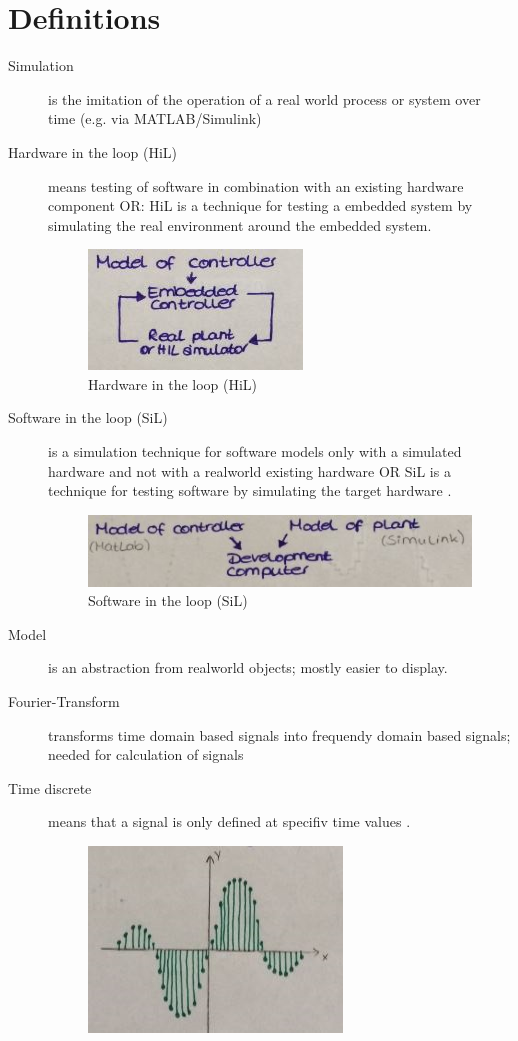 \section{Definitions}
\begin{description}
	\item[Simulation] is the imitation of the operation of a real world process or system over time (e.g. via MATLAB/Simulink)
	\item[Hardware in the loop (HiL)] means testing of software in combination with an existing hardware component OR: HiL is a technique for testing a embedded system by simulating the real environment around the embedded system. 
		\begin{figure}[!h]
		\centering
			\includegraphics[width=0.4\linewidth]{images_LA/HiL}
			\caption{Hardware in the loop (HiL)}
			\label{fig:HiL}
		\end{figure}
	\item[Software in the loop (SiL)] is a simulation technique for software models only with a simulated hardware and not with a realworld existing hardware OR SiL is a technique for testing software by simulating the target hardware .
		\begin{figure}[!h]
			\centering
			\includegraphics[width=0.7\linewidth]{images_LA/SiL}
			\caption{Software in the loop (SiL)}
			\label{fig:SiL}
		\end{figure}
	\item[Model] is an abstraction from realworld objects; mostly easier to display.
	\item[Fourier-Transform] transforms time domain based signals into frequendy domain based signals; needed for calculation of signals
	\item[Time discrete] means that a signal is only defined at specifiv time values .
		\begin{figure}[!h]
			\centering
			\includegraphics[width=0.5\linewidth]{images_LA/timediscrete}

\end{figure}
\end{description}

